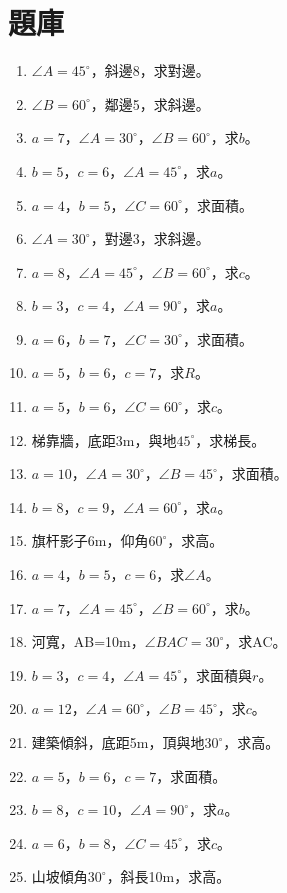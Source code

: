 \section{題庫}
\begin{enumerate}[label=\arabic*.]
    \item $\angle A=45^\circ$，斜邊8，求對邊。
    \item $\angle B=60^\circ$，鄰邊5，求斜邊。
    \item $a=7$，$\angle A=30^\circ$，$\angle B=60^\circ$，求$b$。
    \item $b=5$，$c=6$，$\angle A=45^\circ$，求$a$。
    \item $a=4$，$b=5$，$\angle C=60^\circ$，求面積。
    \item $\angle A=30^\circ$，對邊3，求斜邊。
    \item $a=8$，$\angle A=45^\circ$，$\angle B=60^\circ$，求$c$。
    \item $b=3$，$c=4$，$\angle A=90^\circ$，求$a$。
    \item $a=6$，$b=7$，$\angle C=30^\circ$，求面積。
    \item $a=5$，$b=6$，$c=7$，求$R$。
    \item $a=5$，$b=6$，$\angle C=60^\circ$，求$c$。
    \item 梯靠牆，底距3m，與地$45^\circ$，求梯長。
    \item $a=10$，$\angle A=30^\circ$，$\angle B=45^\circ$，求面積。
    \item $b=8$，$c=9$，$\angle A=60^\circ$，求$a$。
    \item 旗杆影子6m，仰角$60^\circ$，求高。
    \item $a=4$，$b=5$，$c=6$，求$\angle A$。
    \item $a=7$，$\angle A=45^\circ$，$\angle B=60^\circ$，求$b$。
    \item 河寬，AB=10m，$\angle BAC=30^\circ$，求AC。
    \item $b=3$，$c=4$，$\angle A=45^\circ$，求面積與$r$。
    \item $a=12$，$\angle A=60^\circ$，$\angle B=45^\circ$，求$c$。
    \item 建築傾斜，底距5m，頂與地$30^\circ$，求高。
    \item $a=5$，$b=6$，$c=7$，求面積。
    \item $b=8$，$c=10$，$\angle A=90^\circ$，求$a$。
    \item $a=6$，$b=8$，$\angle C=45^\circ$，求$c$。
    \item 山坡傾角$30^\circ$，斜長10m，求高。

\end{enumerate}
